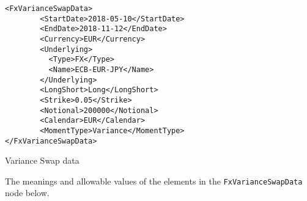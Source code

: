 \begin{listing}[H]
	\begin{verbatim}
<FxVarianceSwapData>
        <StartDate>2018-05-10</StartDate>
        <EndDate>2018-11-12</EndDate>
        <Currency>EUR</Currency>
        <Underlying>
          <Type>FX</Type>
          <Name>ECB-EUR-JPY</Name>
        </Underlying>
        <LongShort>Long</LongShort>
        <Strike>0.05</Strike>
        <Notional>200000</Notional>
        <Calendar>EUR</Calendar>
        <MomentType>Variance</MomentType>
</FxVarianceSwapData>
	\end{verbatim}
	\caption{Variance Swap data}
	\label{lst:fxvarswap_data}
\end{listing}

The meanings and allowable values of the elements in the \lstinline!FxVarianceSwapData! node below.

